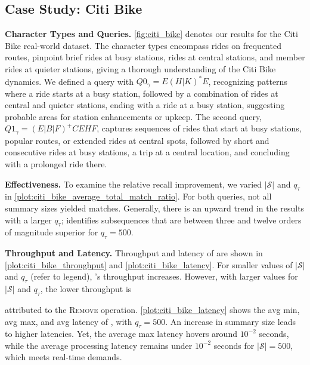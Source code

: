 \subsection{Case Study: Citi Bike}
\label{subsec:citibike}
\textbf{Character Types and Queries.} \autoref{fig:citi_bike} denotes our
results for the Citi Bike real-world dataset. The character types encompass
rides on frequented routes, pinpoint brief rides at busy stations, rides at
central stations, and member rides at quieter stations, giving a thorough
understanding of the Citi Bike dynamics. We defined a query with $Q0_\gamma =
E(H|K)^*E$, recognizing patterns where a ride starts at a busy station, followed by a combination of rides at central and quieter stations, ending with a ride at a busy station, suggesting probable areas for station enhancements or
upkeep. The second query, $Q1_\gamma = (E|B|F)^+CEHF$, captures sequences of
rides that start at busy stations, popular routes, or extended rides at central
spots, followed by short and consecutive rides at busy stations, a trip at a
central location, and concluding with a prolonged ride there.

\textbf{Effectiveness.} To examine the relative recall improvement, we varied
$|\mathcal{S}|$ and $q_\tau$ in
\autoref{plot:citi_bike_average_total_match_ratio}. For both queries, not all
summary sizes yielded matches. Generally,
there is an upward trend in the results with a larger
$q_\tau$; \suse{} identifies subsequences that are between three
and twelve orders of magnitude superior for $q_\tau = 500$.

\textbf{Throughput and Latency.} Throughput and
latency of \suse{} are shown in \autoref{plot:citi_bike_throughput} and
\autoref{plot:citi_bike_latency}. 
For smaller values of $|\mathcal{S}|$ and $q_\tau$ (refer to legend), \suse{}'s
throughput increases. 
However, with larger values for $|\mathcal{S}|$ and $q_\tau$, the lower
throughput is

attributed to the \textsc{Remove} operation.
\autoref{plot:citi_bike_latency} shows the avg min, avg max, and avg
latency of \suse{}, with $q_\tau = 500$. An increase in summary size leads to
higher latencies. Yet, the average max latency hovers around $10^{-2}$
seconds, while the average processing latency remains under $10^{-2}$ seconds
for $|\mathcal{S}| = 500$, which meets real-time demands.


